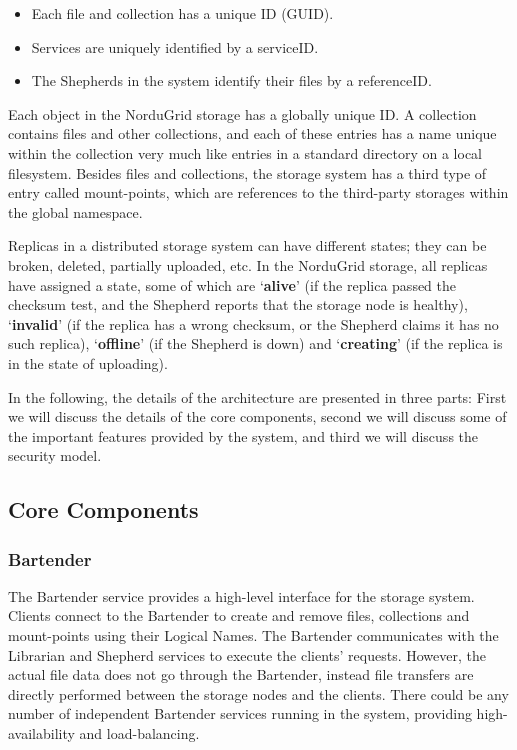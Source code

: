 \documentclass[final]{ieee}
\begin{document}
\begin{itemize} 
\item Each  file and collection has a unique ID (GUID).
\item Services are uniquely identified by a serviceID. 
\item The Shepherds in the system identify their files by a referenceID.
\end{itemize} 

Each object in the NorduGrid storage has a globally
unique ID. A collection contains files and other collections,
and each of these entries has a name unique within the collection very
much like entries in a standard directory on a local filesystem. Besides
files and collections, the storage system has a third type of entry
called mount-points, which are references to the third-party storages
within the global namespace.

Replicas in a distributed storage system can have different states;
they can be broken, deleted, partially uploaded, etc. In the
NorduGrid storage, all replicas have assigned a state, some of which are
`\textbf{alive}' (if the replica passed the checksum test, and the
Shepherd reports that the storage node is healthy), `\textbf{invalid}'
(if the replica has a wrong checksum, or the Shepherd claims it has no
such replica), `\textbf{offline}' (if the Shepherd is down) and `\textbf{creating}' (if the replica is in
the state of uploading).

In the following, the details of the
architecture are presented in three parts: First we will discuss the
details of the core components, second we will discuss some of the
important features provided by the system, and third we will discuss the security model.

\subsection{Core Components} 
\subsubsection{Bartender}
\label{Bartender}
The Bartender service provides a high-level interface for the storage
system. Clients connect to the Bartender to create and remove
files, collections and mount-points using their Logical Names. The
Bartender communicates 
with the Librarian and Shepherd services to execute the clients'
requests. However, the actual file data does not go through the
Bartender, instead file
transfers are directly performed between the storage nodes and the
clients. There could be any number of independent Bartender services
running in the system, providing high-availability and
load-balancing. 
\end{document}
